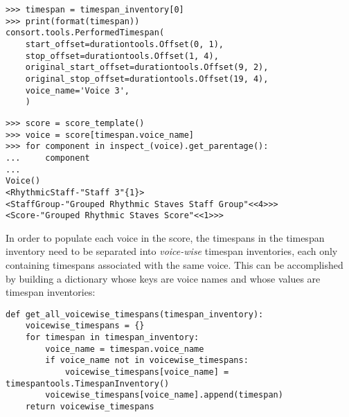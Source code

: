 \begin{abjadbookoutput}
\begin{singlespacing}
\vspace{-0.5\baselineskip}
\begin{lstlisting}
>>> timespan = timespan_inventory[0]
>>> print(format(timespan))
consort.tools.PerformedTimespan(
    start_offset=durationtools.Offset(0, 1),
    stop_offset=durationtools.Offset(1, 4),
    original_start_offset=durationtools.Offset(9, 2),
    original_stop_offset=durationtools.Offset(19, 4),
    voice_name='Voice 3',
    )
\end{lstlisting}
\begin{lstlisting}
>>> score = score_template()
>>> voice = score[timespan.voice_name]
>>> for component in inspect_(voice).get_parentage():
...     component
...
Voice()
<RhythmicStaff-"Staff 3"{1}>
<StaffGroup-"Grouped Rhythmic Staves Staff Group"<<4>>>
<Score-"Grouped Rhythmic Staves Score"<<1>>>
\end{lstlisting}
\end{singlespacing}
\end{abjadbookoutput}

\noindent In order to populate each voice in the score, the timespans in the
timespan inventory need to be separated into \emph{voice-wise} timespan
inventories, each only containing timespans associated with the same voice.
This can be accomplished by building a dictionary whose keys are voice names
and whose values are timespan inventories:

\begin{comment}
<abjadextract dissertation.py.time_tools:get_all_voicewise_timespans />[strip_prompt]
\end{comment}

\begin{abjadbookoutput}
\begin{singlespacing}
\vspace{-0.5\baselineskip}
\begin{lstlisting}
def get_all_voicewise_timespans(timespan_inventory):
    voicewise_timespans = {}
    for timespan in timespan_inventory:
        voice_name = timespan.voice_name
        if voice_name not in voicewise_timespans:
            voicewise_timespans[voice_name] = timespantools.TimespanInventory()
        voicewise_timespans[voice_name].append(timespan)
    return voicewise_timespans
\end{lstlisting}
\end{singlespacing}
\end{abjadbookoutput}

